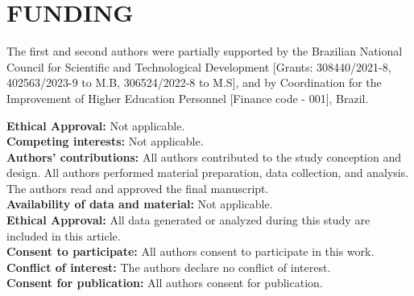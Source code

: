 \documentclass[12pt]{amsart}
\theoremstyle{plain}
\numberwithin{equation}{section}
\begin{document}


\section*{FUNDING}
The first and second authors were partially supported by the Brazilian National Council for Scientific and Technological Development [Grants: 308440/2021-8, 402563/2023-9  to M.B, 306524/2022-8 to M.S], and by Coordination for the Improvement of Higher Education Personnel [Finance code - 001], Brazil.


\bigskip

\begin{flushleft}
 
 {\bf Ethical Approval:}  Not applicable.\\
 {\bf Competing interests:}  Not applicable. \\
 {\bf Authors' contributions:}    All authors contributed to the study conception and design. All authors performed material preparation, data collection, and analysis. The authors read and approved the final manuscript.\\
{\bf Availability of data and material:}  Not applicable.\\
{\bf Ethical Approval:}  All data generated or analyzed during this study are included in this article.\\
{\bf Consent to participate:}  All authors consent to participate in this work.\\
{\bf Conflict of interest:} The authors declare no conflict of interest. \\
{\bf Consent for publication:}  All authors consent for publication. \\
\end{flushleft}
\end{document}
